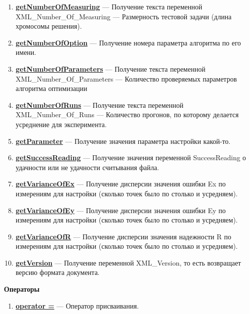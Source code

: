 \begin{enumerate}
\item \textbf{\hyperref[getNumberOfMeasuring]{getNumberOfMeasuring}} --- Получение текста переменной  XML\_Number\_Of\_Measuring --- Размерность тестовой задачи (длина хромосомы решения).

\item \textbf{\hyperref[getNumberOfOption]{getNumberOfOption}} --- Получение номера параметра алгоритма по его имени.

\item \textbf{\hyperref[getNumberOfParameters]{getNumberOfParameters}} --- Получение текста переменной  XML\_Number\_Of\_Parameters --- Количество проверяемых параметров алгоритма оптимизации

\item \textbf{\hyperref[getNumberOfRuns]{getNumberOfRuns}} --- Получение текста переменной  XML\_Number\_Of\_Runs --- Количество прогонов, по которому делается усреднение для эксперимента.

\item \textbf{\hyperref[getParameter]{getParameter}} --- Получение значения параметра настройки какой-то.

\item \textbf{\hyperref[getSuccessReading]{getSuccessReading}} --- Получение значения переменной SuccessReading о удачности или не удачности считывания файла.

\item \textbf{\hyperref[getVarianceOfEx]{getVarianceOfEx}} --- Получение дисперсии значения ошибки Ex по измерениям для настройки (сколько точек было по столько и усредняем).

\item \textbf{\hyperref[getVarianceOfEy]{getVarianceOfEy}} --- Получение дисперсии значения ошибки Ey по измерениям для настройки (сколько точек было по столько и усредняем).

\item \textbf{\hyperref[getVarianceOfR]{getVarianceOfR}} --- Получение дисперсии значения надежности R по измерениям для настройки (сколько точек было по столько и усредняем).

\item \textbf{\hyperref[getVersion]{getVersion}} --- Получение переменной XML\_Version, то есть возвращает версию формата документа.

\end{enumerate}

\textbf{Операторы}
\begin{enumerate}

\item \textbf{\hyperref[operator =]{operator =}} --- Оператор присваивания.

\end{enumerate}

